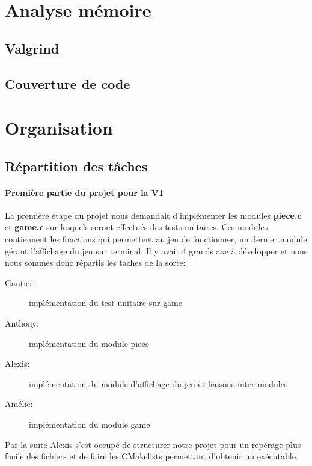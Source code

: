 \documentclass{report}
\begin{document}
\chapter{Analyse mémoire}
\setcounter{section}{0}
\section{Valgrind}

\section{Couverture de code}



\chapter{Organisation}
\setcounter{section}{0}
\section{Répartition des tâches}
\subsubsection*{Première partie du projet pour la V1}
La première étape du projet nous demandait d'implémenter les modules \textbf{piece.c} et \textbf{game.c} sur lesquels seront effectués des tests unitaires. Ces modules contiennent les fonctions qui permettent au jeu de fonctionner, un dernier module gérant l'affichage du jeu sur terminal. Il y avait 4 grands axe à développer et nous nous sommes donc répartis les taches de la sorte:
\begin{description}
\item [Gautier:] implémentation du test unitaire sur game
\item [Anthony:] implémentation du module piece
\item [Alexis:] implémentation du module d'affichage du jeu et liaisons inter modules
\item [Amélie:] implémentation du module game
\end{description}
Par la suite Alexis s'est occupé de structurer notre projet pour un repérage plus facile des fichiers et de faire les CMakelists permettant d'obtenir un exécutable.
\end{document}
